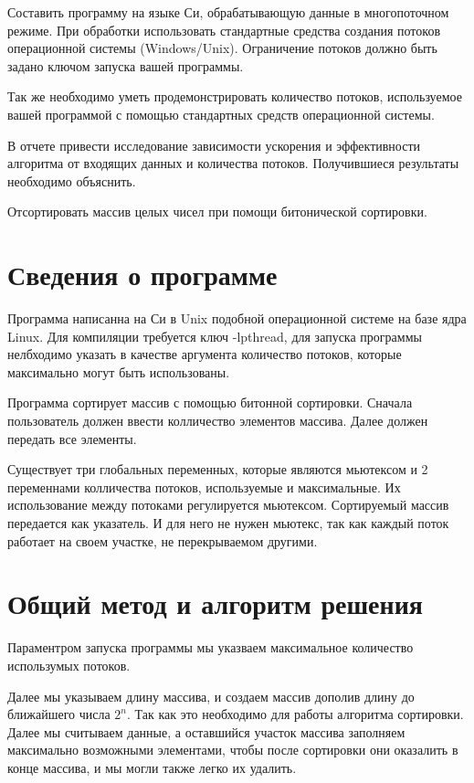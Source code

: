 \documentclass[pdf, unicode, 12pt, a4paper,oneside,fleqn]{article}
\begin{document}
Составить программу на языке Си, обрабатывающую данные в многопоточном
режиме. При обработки использовать стандартные средства создания потоков
операционной системы (Windows/Unix). Ограничение потоков должно быть задано 
ключом запуска вашей программы.

Так же необходимо уметь продемонстрировать количество потоков, используемое 
вашей программой с помощью стандартных средств операционной системы.

В отчете привести исследование зависимости ускорения и эффективности 
алгоритма от входящих данных и количества потоков. Получившиеся результаты 
необходимо объяснить.

Отсортировать массив целых чисел при помощи битонической сортировки.

\section{Сведения о программе}

Программа написанна на Си в Unix подобной операционной системе на базе ядра Linux.
Для компиляции требуется ключ -lpthread, для запуска программы нелбходимо указать
в качестве аргумента количество потоков, которые максимально могут быть использованы.

Программа сортирует массив с помощью битонной сортировки.
Сначала пользователь должен ввести колличество элементов массива.
Далее должен передать все элементы.

Существует три глобальных переменных, которые являются мьютексом и 2 переменнами колличества потоков,
используемые и максимальные. Их использование между потоками регулируется мьютексом.
Сортируемый массив передается как указатель. И для него не нужен мьютекс, так как 
каждый поток работает на своем участке, не перекрываемом другими.

\section{Общий метод и алгоритм решения}

Параментром запуска программы мы указваем максимальное количество использумых потоков.

Далее мы указываем длину массива, и создаем массив дополив длину до ближайшего числа $2^n$.
Так как это необходимо для работы алгоритма сортировки. Далее мы считываем 
данные, а оставшийся участок массива заполняем максимально возможными элементами,
чтобы после сортировки они оказалить в конце массива, и мы могли также легко их удалить.
\end{document}

